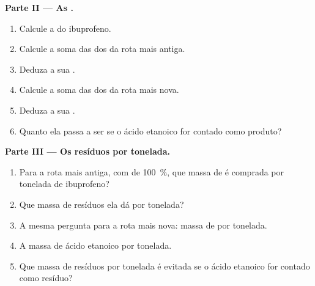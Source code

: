 \begin{problem}
\medskip
\noindent\textbf{Parte II --- As .}
\begin{enumerate}[resume]
  \item Calcule a  do ibuprofeno.
  \item Calcule a soma das  dos  da rota mais
        antiga.
  \item Deduza a sua .
  \item Calcule a soma das  dos  da rota mais
        nova.
  \item Deduza a sua .
  \item Quanto ela passa a ser se o ácido etanoico for contado como
        produto?
\end{enumerate}

\medskip
\noindent\textbf{Parte III --- Os resíduos por tonelada.}
\begin{enumerate}[resume]
  \item Para a rota mais antiga, com  de \qty{100}{\percent},
        que massa de  é comprada por tonelada de ibuprofeno?
  \item Que massa de resíduos ela dá por tonelada?
  \item A mesma pergunta para a rota mais nova: massa de  por
        tonelada.
  \item A massa de ácido etanoico por tonelada.
  \item Que massa de resíduos por tonelada é evitada se o ácido
        etanoico for contado como resíduo?
\end{enumerate}


\end{problem}

